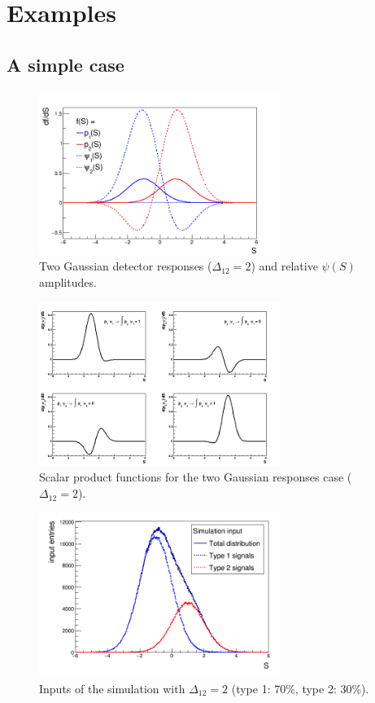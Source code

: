 \section{Examples}
\subsection{A simple case}

\begin{figure}[!htb]
\centering
\includegraphics[width=0.7\textwidth]{../png/figGaus2.png}
\caption{Two Gaussian detector responses ($\Delta_{12} = 2$) and relative
  $\psi(S)$ amplitudes.}
\label{fig:Gaus2}
\end{figure}

\begin{figure}[!htb]
\centering
\includegraphics[width=0.7\textwidth]{../png/figSPgaus.png}
\caption{Scalar product functions for the two Gaussian responses case ($\Delta_{12} = 2$).}
\label{fig:SPGaus2}
\end{figure}


\begin{figure}[!htb]
\centering
\includegraphics[width=0.7\textwidth]{../png/figInput.png}
\caption{Inputs of the simulation with $\Delta_{12} = 2$ (type 1: 70\%, type 2: 30\%).}
\label{fig:InputGaus2}
\end{figure}

